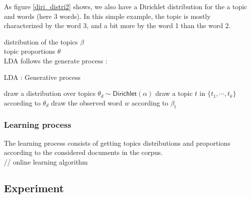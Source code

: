 \documentclass[a4paper,twoside,12pt,openright]{report}
\begin{document}
As figure \ref{diri_distri2} shows, we also have a Dirichlet distribution for the a topic and words (here 3 words). In this simple example, the topic is mostly characterized by the word 3, and a bit more by the word 1 than the word 2.

distribution of the topics $\beta$\\
topic proportions $\theta$\\

LDA follows the generate process : 
\begin{algorithm}
\caption{LDA : Generative process}
\label{algo:hashtagsGraph}
\begin{algorithmic} 
\STATE draw a distribution over topics $\theta_d \sim \textsf{Dirichlet}(\alpha)$
\STATE draw a topic $t$ in $\{t_1,\cdots,t_k\}$ according to $\theta_d$
\STATE draw the observed word $w$ according to $\beta_t$
\ENDFOR
\ENDFOR
\\[10pt]
\end{algorithmic}
\end{algorithm}

\subsubsection{Learning process}
The learning process consists of getting topics distributions and proportions according to the considered documents in the corpus.\\

// online learning algorithm 


\newpage

\subsection{Experiment}
\end{document}
